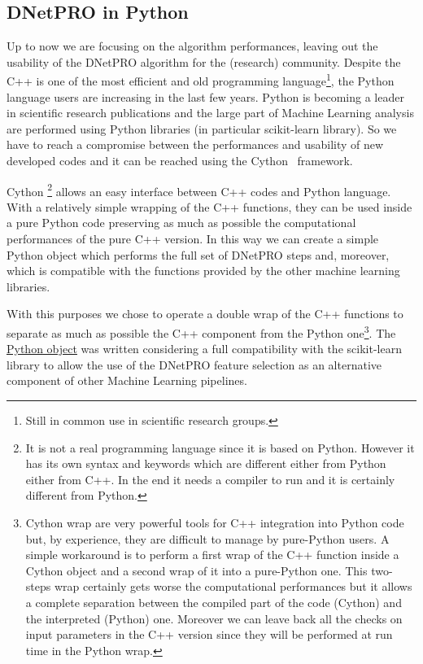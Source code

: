 \documentclass{standalone}
\begin{document}
\subsection[Python wrap]{DNetPRO in Python}\label{implementation:python}

Up to now we are focusing on the algorithm performances, leaving out the usability of the DNetPRO algorithm for the (research) community.
Despite the \textsf{C++} is one of the most efficient and old programming language\footnote{
  Still in common use in scientific research groups.
}, the \textsf{Python} language users are increasing in the last few years.
\textsf{Python} is becoming a leader in scientific research publications and the large part of Machine Learning analysis are performed using \textsf{Python} libraries (in particular \textsf{scikit-learn} library).
So we have to reach a compromise between the performances and usability of new developed codes and it can be reached using the \textsf{Cython}~\cite{behnel2010cython} framework.

Cython \footnote{
  It is not a real programming language since it is based on \textsf{Python}.
  However it has its own syntax and keywords which are different either from \textsf{Python} either from \textsf{C++}.
  In the end it needs a compiler to run and it is certainly different from \textsf{Python}.
} allows an easy interface between \textsf{C++} codes and \textsf{Python} language.
With a relatively simple wrapping of the \textsf{C++} functions, they can be used inside a pure \textsf{Python} code preserving as much as possible the computational performances of the pure \textsf{C++} version.
In this way we can create a simple \textsf{Python} object which performs the full set of DNetPRO steps and, moreover, which is compatible with the functions provided by the other machine learning libraries.

With this purposes we chose to operate a double wrap of the \textsf{C++} functions to separate as much as possible the \textsf{C++} component from the \textsf{Python} one\footnote{
  Cython wrap are very powerful tools for \textsf{C++} integration into \textsf{Python} code but, by experience, they are difficult to manage by pure-\textsf{Python} users.
  A simple workaround is to perform a first wrap of the \textsf{C++} function inside a Cython object and a second wrap of it into a pure-\textsf{Python} one.
  This two-steps wrap certainly gets worse the computational performances but it allows a complete separation between the compiled part of the code (\textsf{Cython}) and the interpreted (\textsf{Python}) one.
  Moreover we can leave back all the checks on input parameters
  in the \textsf{C++} version since they will be performed at run time in the Python wrap.
}.
The \href{https://github.com/Nico-Curti/DNetPRO/blob/master/DNetPRO/DNetPRO.py}{\textsf{Python} object} was written considering a full compatibility with the \textsf{scikit-learn} library to allow the use of the DNetPRO feature selection as an alternative component of other Machine Learning pipelines.
\end{document}
